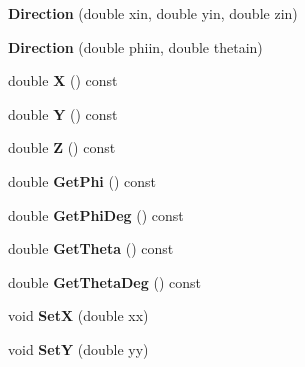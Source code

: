 \begin{DoxyCompactItemize}
\item 
\hypertarget{classDirection_a6ab97d45f5cba3aa5e571f0c0e8dd5be}{{\bfseries Direction} (double xin, double yin, double zin)}\label{classDirection_a6ab97d45f5cba3aa5e571f0c0e8dd5be}

\item 
\hypertarget{classDirection_ae577ffea4af24ebc490093c55adbbdba}{{\bfseries Direction} (double phiin, double thetain)}\label{classDirection_ae577ffea4af24ebc490093c55adbbdba}

\item 
\hypertarget{classDirection_a16e35cd86702666a7f2a9de1962b99d3}{double {\bfseries X} () const }\label{classDirection_a16e35cd86702666a7f2a9de1962b99d3}

\item 
\hypertarget{classDirection_a87038a7a2381c3bfa062d1016ece1b0a}{double {\bfseries Y} () const }\label{classDirection_a87038a7a2381c3bfa062d1016ece1b0a}

\item 
\hypertarget{classDirection_a7e8275fe3078f9fb2c4f17cafd219dca}{double {\bfseries Z} () const }\label{classDirection_a7e8275fe3078f9fb2c4f17cafd219dca}

\item 
\hypertarget{classDirection_ae60296b4e458a378de7fac5e194d128a}{double {\bfseries Get\-Phi} () const }\label{classDirection_ae60296b4e458a378de7fac5e194d128a}

\item 
\hypertarget{classDirection_ab10dd98d45f913882643a8ec3a0063a1}{double {\bfseries Get\-Phi\-Deg} () const }\label{classDirection_ab10dd98d45f913882643a8ec3a0063a1}

\item 
\hypertarget{classDirection_aedb9b4a05e136edbb8d9ff19b84a5698}{double {\bfseries Get\-Theta} () const }\label{classDirection_aedb9b4a05e136edbb8d9ff19b84a5698}

\item 
\hypertarget{classDirection_a3ed1c31e69e15d4b6a50aeb5bbf48049}{double {\bfseries Get\-Theta\-Deg} () const }\label{classDirection_a3ed1c31e69e15d4b6a50aeb5bbf48049}

\item 
\hypertarget{classDirection_a384688a73b4fea94e29f76401c329588}{void {\bfseries Set\-X} (double xx)}\label{classDirection_a384688a73b4fea94e29f76401c329588}

\item 
\hypertarget{classDirection_a879833b6fdb717fa5eee797e9fa37110}{void {\bfseries Set\-Y} (double yy)}\label{classDirection_a879833b6fdb717fa5eee797e9fa37110}


\end{DoxyCompactItemize}
